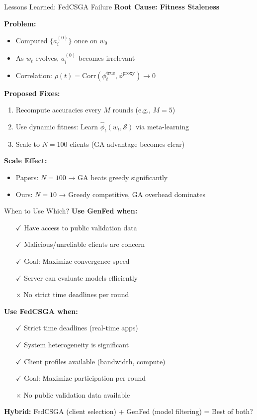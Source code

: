 \documentclass{beamer}
\begin{document}
\begin{frame}{Lessons Learned: FedCSGA Failure}
\textbf{Root Cause: Fitness Staleness}

\textbf{Problem:}
\begin{itemize}
\item Computed $\{a_i^{(0)}\}$ once on $w_0$
\item As $w_t$ evolves, $a_i^{(0)}$ becomes irrelevant
\item Correlation: $\rho(t) = \text{Corr}(\phi_t^{\text{true}}, \phi^{\text{proxy}}) \to 0$
\end{itemize}

\textbf{Proposed Fixes:}
\begin{enumerate}
\item Recompute accuracies every $M$ rounds (e.g., $M=5$)
\item Use dynamic fitness: Learn $\hat{\phi}_t(w_t, \mathcal{S})$ via meta-learning
\item Scale to $N=100$ clients (GA advantage becomes clear)
\end{enumerate}

\textbf{Scale Effect:}
\begin{itemize}
\item Papers: $N=100$ → GA beats greedy significantly
\item Ours: $N=10$ → Greedy competitive, GA overhead dominates
\end{itemize}
\end{frame}

\begin{frame}{When to Use Which?}
\textbf{Use GenFed when:}
\begin{itemize}
\item[$\checkmark$] Have access to public validation data
\item[$\checkmark$] Malicious/unreliable clients are concern
\item[$\checkmark$] Goal: Maximize convergence speed
\item[$\checkmark$] Server can evaluate models efficiently
\item[$\times$] No strict time deadlines per round
\end{itemize}

\textbf{Use FedCSGA when:}
\begin{itemize}
\item[$\checkmark$] Strict time deadlines (real-time apps)
\item[$\checkmark$] System heterogeneity is significant
\item[$\checkmark$] Client profiles available (bandwidth, compute)
\item[$\checkmark$] Goal: Maximize participation per round
\item[$\times$] No public validation data available
\end{itemize}

\textbf{Hybrid:} FedCSGA (client selection) + GenFed (model filtering) = Best of both?
\end{frame}
\end{document}
